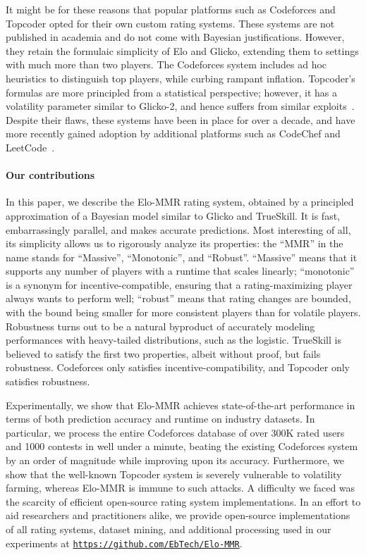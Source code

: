 It might be for these reasons that popular platforms such as Codeforces and Topcoder opted for their own custom rating systems. These systems are not published in academia and do not come with Bayesian justifications. However, they retain the formulaic simplicity of Elo and Glicko, extending them to settings with much more than two players. The Codeforces system includes ad hoc heuristics to distinguish top players, while curbing rampant inflation. Topcoder's formulas are more principled from a statistical perspective; however, it has a volatility parameter similar to Glicko-2, and hence suffers from similar exploits~\cite{forivsektheoretical}. Despite their flaws, these systems have been in place for over a decade, and have more recently gained adoption by additional platforms such as CodeChef and LeetCode~\cite{LeetCode, CodeChef}.


\paragraph{Our contributions} 
In this paper, we describe the Elo-MMR rating system, obtained by a principled approximation of a Bayesian model similar to Glicko and TrueSkill. It is fast, embarrassingly parallel, and makes accurate predictions. Most interesting of all, its simplicity allows us to rigorously analyze its properties: the ``MMR'' in the name stands for ``Massive'', ``Monotonic'', and ``Robust''. ``Massive'' means that it supports any number of players with a runtime that scales linearly; ``monotonic'' is a synonym for incentive-compatible, ensuring that a rating-maximizing player always wants to perform well; ``robust'' means that rating changes are bounded, with the bound being smaller for more consistent players than for volatile players. Robustness turns out to be a natural byproduct of accurately modeling performances with heavy-tailed distributions, such as the logistic. TrueSkill is believed to satisfy the first two properties, albeit without proof, but fails robustness. Codeforces only satisfies incentive-compatibility, and Topcoder only satisfies robustness.

Experimentally, we show that Elo-MMR achieves state-of-the-art performance in terms of both prediction accuracy and runtime on industry datasets. In particular, we process the entire Codeforces database of over 300K rated users and 1000 contests in well under a minute, beating the existing Codeforces system by an order of magnitude while improving upon its accuracy. Furthermore, we show that the well-known Topcoder system is severely vulnerable to volatility farming, whereas Elo-MMR is immune to such attacks. A difficulty we faced was the scarcity of efficient open-source rating system implementations. In an effort to aid researchers and practitioners alike, we provide open-source implementations of all rating systems, dataset mining, and additional processing used in our experiments at {\tt\url{https://github.com/EbTech/Elo-MMR}}.

